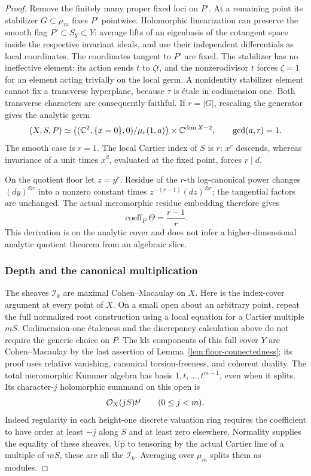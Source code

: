 \begin{proof}
Remove the finitely many proper fixed loci on \(P'\).  At a remaining
point its stabilizer \(G\subset\mu_m\) fixes \(P'\) pointwise.  Holomorphic
linearization can preserve the smooth flag
\(P'\subset S_Y\subset Y\): average lifts of an eigenbasis of the
cotangent space inside the respective invariant ideals, and use their
independent differentials as local coordinates.  The coordinates tangent
to \(P'\) are fixed.  The stabilizer has no ineffective element: its
action sends \(t\) to \(\zeta t\), and the nonzerodivisor \(t\) forces
\(\zeta=1\) for an element acting trivially on the local germ.  A
nonidentity stabilizer element cannot fix a transverse hyperplane,
because \(\tau\) is étale in codimension one.  Both transverse
characters are consequently faithful.  If \(r=|G|\), rescaling the
generator gives the analytic germ
\begin{equation}\label{eq:plt-analytic-quotient}
 (X,S,P)\simeq
 \bigl((\mathbb C^2,\{x=0\},0)/\mu_r(1,a)\bigr)
      \times\mathbb C^{\dim X-2},\qquad \gcd(a,r)=1 .
\end{equation}
The smooth case is \(r=1\).  The local Cartier index of \(S\) is \(r\):
\(x^r\) descends, whereas invariance of a unit times \(x^d\), evaluated
at the fixed point, forces \(r\mid d\).

On the quotient floor let \(z=y^r\).  Residue of the \(r\)-th
log-canonical power changes \((dy)^{\otimes r}\) into a nonzero constant
times \(z^{-(r-1)}(dz)^{\otimes r}\); the tangential factors are
unchanged.  The actual meromorphic residue embedding therefore gives
\begin{equation}\label{eq:bare-different-index}
 \operatorname{coeff}_P\Theta=\frac{r-1}{r}.
\end{equation}
This derivation is on the analytic cover and does not infer a
higher-dimensional analytic quotient theorem from an algebraic slice.

\subsubsection*{Depth and the canonical multiplication}

The sheaves \(\mathscr I_k\) are maximal Cohen--Macaulay on \(X\).
Here is the index-cover argument at every point of \(X\).  On a small
open about an arbitrary point, repeat the full normalized root construction
using a local equation for a Cartier multiple \(mS\).  Codimension-one
étaleness and the discrepancy calculation above do not require the
generic choice on \(P\).  The klt components of this full cover \(Y\)
are Cohen--Macaulay by the last assertion of
Lemma~\ref{lem:floor-connectedness}; its proof uses relative vanishing,
canonical torsion-freeness, and coherent duality.  The total meromorphic
Kummer algebra has basis \(1,t,\ldots,t^{m-1}\), even when it splits.
Its character-\(j\) holomorphic summand on this open is
\[
 \mathcal O_X(jS)t^j\qquad(0\leq j<m).
\]
Indeed regularity in each height-one discrete valuation ring requires
the coefficient to have order at least \(-j\) along \(S\) and at least
zero elsewhere.  Normality supplies the equality of these sheaves.
Up to tensoring by the actual Cartier line of a multiple of \(mS\),
these are all the \(\mathscr I_k\).  Averaging over \(\mu_m\) splits
them as modules.


\end{proof}
